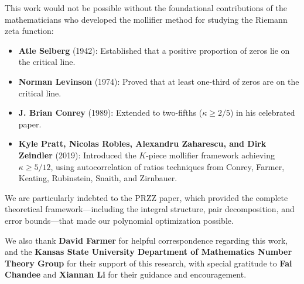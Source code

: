 \documentclass[11pt]{article}
\begin{document}
This work would not be possible without the foundational contributions of the mathematicians who developed the mollifier method for studying the Riemann zeta function:

\begin{itemize}
\item \textbf{Atle Selberg} (1942): Established that a positive proportion of zeros lie on the critical line.
\item \textbf{Norman Levinson} (1974): Proved that at least one-third of zeros are on the critical line.
\item \textbf{J. Brian Conrey} (1989): Extended to two-fifths ($\kappa \geq 2/5$) in his celebrated paper.
\item \textbf{Kyle Pratt, Nicolas Robles, Alexandru Zaharescu, and Dirk Zeindler} (2019): Introduced the $K$-piece mollifier framework achieving $\kappa \geq 5/12$, using autocorrelation of ratios techniques from Conrey, Farmer, Keating, Rubinstein, Snaith, and Zirnbauer.
\end{itemize}

We are particularly indebted to the PRZZ paper, which provided the complete theoretical framework---including the integral structure, pair decomposition, and error bounds---that made our polynomial optimization possible.

We also thank \textbf{David Farmer} for helpful correspondence regarding this work, and the \textbf{Kansas State University Department of Mathematics Number Theory Group} for their support of this research, with special gratitude to \textbf{Fai Chandee} and \textbf{Xiannan Li} for their guidance and encouragement.
\end{document}
